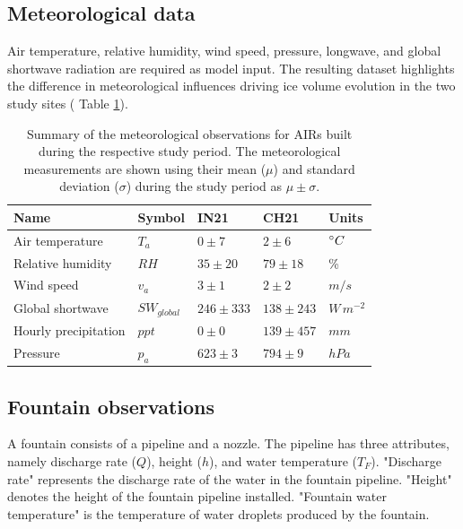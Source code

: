\subsection{Meteorological data}

Air temperature, relative humidity, wind speed, pressure, longwave, and global shortwave radiation are required
as model input. The resulting dataset highlights the difference in meteorological influences driving ice
volume evolution in the two study sites ( Table \ref{tab:Observations}).

\begin{table}
	\centering
	\caption{Summary of the meteorological observations for \ac{AIRs} built during the respective study period.
		The meteorological measurements are shown using their mean ($\mu$) and standard deviation ($\sigma$) during the study
		period as $\mu \pm \sigma$. }

	\label{tab:Observations}
	\begin{tabular}{|lllll|}
		\hline
		\textbf{Name}        & \textbf{Symbol} & \textbf{IN21} & \textbf{CH21} & \textbf{Units} \\ \hline
		Air temperature      & $T_a    $       & $0 \pm 7$     & $2 \pm 6$     & $^{\circ} C$    \\
		Relative humidity    & $RH     $       & $35 \pm 20$   & $79 \pm 18$   & \%             \\
		Wind speed           & $v_a        $   & $3 \pm 1$     & $2 \pm 2$     & $m/s$          \\
		Global shortwave     & $SW_{global} $  & $246 \pm 333$ & $138 \pm 243$  & $W\,m^{-2}$    \\
		Hourly precipitation & $ppt        $   & $0 \pm 0$     & $139 \pm 457$ & $mm$           \\
		Pressure             & $p_a         $  & $623 \pm 3$   & $794 \pm 9$   & $hPa$          \\\hline
	\end{tabular}
\end{table}

\subsection{Fountain observations}

A fountain consists of a pipeline and a nozzle. The pipeline has three attributes, namely discharge rate
($Q$), height ($h$), and water temperature ($T_F$). "Discharge rate" represents the discharge rate of the water in
the fountain pipeline. "Height" denotes the height of the fountain pipeline installed. "Fountain water temperature"
is the temperature of water droplets produced by the fountain.

